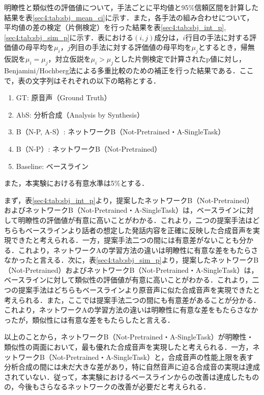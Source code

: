 \documentclass[12pt]{jarticle}
\numberwithin{equation}{section}    %
\numberwithin{figure}{section}      %
\numberwithin{table}{section}      %
\begin{document}
明瞭性と類似性の評価値について，手法ごとに平均値と95\%信頼区間を計算した結果を表\ref{sec4:tab:sbj_mean_ci}に示す．また，各手法の組み合わせについて，平均値の差の検定（片側検定）を行った結果を表\ref{sec4:tab:sbj_int_p}, \ref{sec4:tab:sbj_sim_p}に示す．表における$(i, j)$成分は，$i$行目の手法に対する評価値の母平均を$\mu_{i}$，$j$列目の手法に対する評価値の母平均を$\mu_{j}$とするとき，帰無仮説を$\mu_{i} = \mu_{j}$，対立仮説を$\mu_{i} > \mu_{j}$とした片側検定で計算されたp値に対し，Benjamini/Hochberg法による多重比較のための補正を行った結果である．ここで，表の文字列はそれぞれの以下の略称とする．
\begin{enumerate}
    \item GT: 原音声（Ground Truth）
    \item AbS: 分析合成（Analysis by Synthesis）
    \item B（N-P, A-S）: ネットワークB（Not-Pretrained・A-SingleTask）
    \item B（N-P）: ネットワークB（Not-Pretrained）
    \item Baseline: ベースライン
\end{enumerate}
また，本実験における有意水準は5\%とする．

まず，表\ref{sec4:tab:sbj_int_p}より，提案したネットワークB（Not-Pretrained）およびネットワークB（Not-Pretrained・A-SingleTask）は，ベースラインに対して明瞭性の評価値が有意に高いことがわかる．これより，二つの提案手法はどちらもベースラインより話者の想定した発話内容を正確に反映した合成音声を実現できたと考えられる．一方，提案手法二つの間には有意差がないことも分かる．これより，ネットワークAの学習方法の違いは明瞭性に有意な差をもたらさなかったと言える．次に，表\ref{sec4:tab:sbj_sim_p}より，提案したネットワークB（Not-Pretrained）およびネットワークB（Not-Pretrained・A-SingleTask）は，ベースラインに対して類似性の評価値が有意に高いことがわかる．これより，二つの提案手法はどちらもベースラインより原音声に似た合成音声を実現できたと考えられる．また，ここでは提案手法二つの間にも有意差があることが分かる．これより，ネットワークAの学習方法の違いは明瞭性に有意な差をもたらさなかったが，類似性には有意な差をもたらしたと言える．

以上のことから，ネットワークB（Not-Pretrained・A-SingleTask）が明瞭性・類似性の両面において，最も優れた合成音声を実現したと考えられる．一方，ネットワークB（Not-Pretrained・A-SingleTask）と，合成音声の性能上限を表す分析合成の間には未だ大きな差があり，特に自然音声に迫る合成音の実現は達成されていない．従って，本実験におけるベースラインからの改善は達成したものの，今後もさらなるネットワークの改善が必要だと考えられる．
\end{document}
